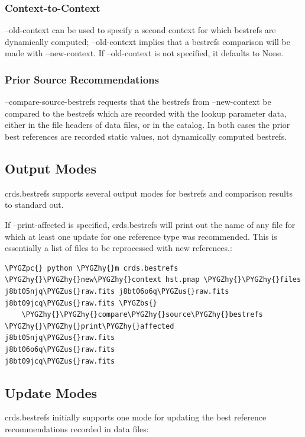 \documentclass[letterpaper,10pt,english]{sphinxmanual}
\def\PYGZbs{\char`\\}
\def\PYGZus{\char`\_}
\def\PYGZpc{\char`\%}
\def\PYGZhy{\char`\-}
\begin{document}
\subsubsection{Context-to-Context}
\label{command_line_tools:context-to-context}
--old-context can be used to specify a second context for which bestrefs are dynamically computed; --old-context
implies that a bestrefs comparison will be made with --new-context.   If --old-context is not specified,  it
defaults to None.


\subsubsection{Prior Source Recommendations}
\label{command_line_tools:prior-source-recommendations}
--compare-source-bestrefs requests that the bestrefs from --new-context be compared to the bestrefs which are
recorded with the lookup parameter data,  either in the file headers of data files,  or in the catalog.   In both
cases the prior best references are recorded static values,  not dynamically computed bestrefs.


\subsection{Output Modes}
\label{command_line_tools:output-modes}
crds.bestrefs supports several output modes for bestrefs and comparison results to standard out.

If --print-affected is specified,  crds.bestrefs will print out the name of any file for which at least one update for
one reference type was recommended.   This is essentially a list of files to be reprocessed with new references.:

\begin{Verbatim}[commandchars=\\\{\}]
\PYGZpc{} python \PYGZhy{}m crds.bestrefs \PYGZhy{}\PYGZhy{}new\PYGZhy{}context hst.pmap \PYGZhy{}\PYGZhy{}files j8bt05njq\PYGZus{}raw.fits j8bt06o6q\PYGZus{}raw.fits j8bt09jcq\PYGZus{}raw.fits \PYGZbs{}
    \PYGZhy{}\PYGZhy{}compare\PYGZhy{}source\PYGZhy{}bestrefs \PYGZhy{}\PYGZhy{}print\PYGZhy{}affected
j8bt05njq\PYGZus{}raw.fits
j8bt06o6q\PYGZus{}raw.fits
j8bt09jcq\PYGZus{}raw.fits
\end{Verbatim}


\subsection{Update Modes}
\label{command_line_tools:update-modes}
crds.bestrefs initially supports one mode for updating the best reference recommendations recorded in data files:
\end{document}
